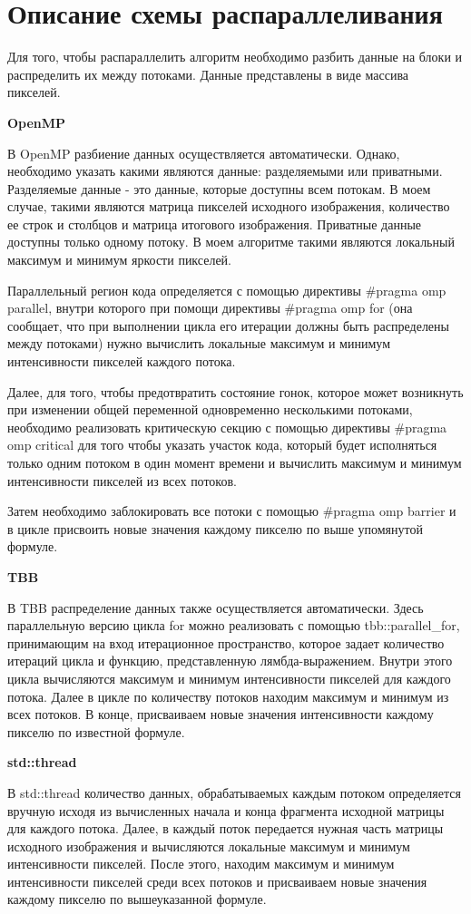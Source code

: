 \documentclass{report}
\begin{document}
\section*{Описание схемы распараллеливания}
\par Для того, чтобы распараллелить алгоритм необходимо разбить данные на блоки и распределить их между потоками. Данные представлены в виде массива пикселей.
\par \textbf{OpenMP} 
\par В OpenMP разбиение данных осуществляется автоматически. Однако, необходимо указать какими являются данные: разделяемыми или приватными. Разделяемые данные - это данные, которые доступны всем потокам. В моем случае, такими являются матрица пикселей исходного изображения, количество ее строк и столбцов и матрица итогового изображения. Приватные данные доступны только одному потоку. В моем алгоритме такими являются локальный максимум и минимум яркости пикселей. 
\par Параллельный регион кода определяется с помощью директивы #pragma omp parallel, внутри которого при помощи директивы #pragma omp for (она сообщает, что при выполнении цикла его итерации должны быть распределены между потоками) нужно вычислить локальные максимум и минимум интенсивности пикселей каждого потока. 
\par Далее, для того, чтобы предотвратить состояние гонок, которое может возникнуть при изменении общей переменной одновременно несколькими потоками, необходимо реализовать критическую секцию с помощью директивы #pragma omp critical для того чтобы указать участок кода, который будет исполняться только одним потоком в один момент времени и вычислить максимум и минимум интенсивности пикселей из всех потоков. 
\par Затем необходимо заблокировать все потоки с помощью #pragma omp barrier и в цикле присвоить новые значения каждому пикселю по выше упомянутой формуле. 
\par \textbf{TBB}
\par В TBB распределение данных также осуществляется автоматически. Здесь параллельную версию цикла for можно реализовать с помощью tbb::parallel\_for, принимающим на вход итерационное пространство, которое задает количество итераций цикла и функцию, представленную лямбда-выражением. Внутри этого цикла вычисляются максимум и минимум интенсивности пикселей для каждого потока. Далее в цикле по количеству потоков находим максимум и минимум из всех потоков. В конце, присваиваем новые значения интенсивности каждому пикселю по известной формуле.
\par \textbf{std::thread}
\par В std::thread количество данных, обрабатываемых каждым потоком определяется вручную исходя из вычисленных начала и конца фрагмента исходной матрицы для каждого потока. Далее, в каждый поток передается нужная часть матрицы исходного изображения и вычисляются локальные максимум и минимум интенсивности пикселей. После этого, находим максимум и минимум интенсивности пикселей среди всех потоков и присваиваем новые значения каждому пикселю по вышеуказанной формуле.
\newpage
\end{document}
